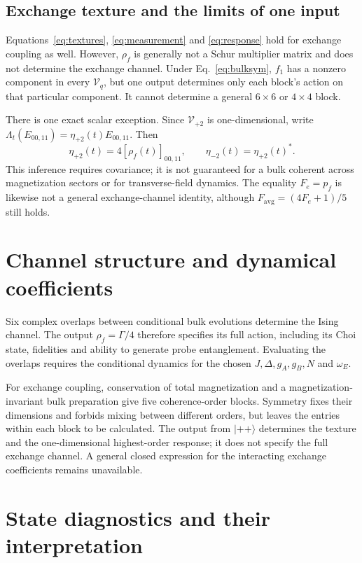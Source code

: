 \documentclass[11pt,a4paper]{article}
\newcommand{\ket}[1]{\lvert #1\rangle}
\begin{document}
\subsection{Exchange texture and the limits of one input}

Equations~\eqref{eq:textures}, \eqref{eq:measurement} and
\eqref{eq:response} hold for exchange coupling as well. However,
$\rho_f$ is generally not a Schur multiplier matrix and does not
determine the exchange channel. Under Eq.~\eqref{eq:bulksym}, $f_1$
has a nonzero component in every $\mathcal V_q$, but one output
determines only each block's action on that particular component.
It cannot determine a general $6\times6$ or $4\times4$ block.

There is one exact scalar exception. Since $\mathcal V_{+2}$ is
one-dimensional, write
$\Lambda_t(E_{00,11})=\eta_{+2}(t)E_{00,11}$. Then
\begin{equation}
 \eta_{+2}(t)=4[\rho_f(t)]_{00,11},\qquad
 \eta_{-2}(t)=\eta_{+2}(t)^*.
\end{equation}
This inference requires covariance; it is not guaranteed for a bulk
coherent across magnetization sectors or for transverse-field dynamics.
The equality $F_e=p_f$ is likewise not a general exchange-channel
identity, although $F_{\mathrm{avg}}=(4F_e+1)/5$ still holds.

\section{Channel structure and dynamical coefficients}

Six complex overlaps between conditional bulk evolutions determine the
Ising channel. The output $\rho_f=\Gamma/4$ therefore specifies its full
action, including its Choi state, fidelities and ability to generate
probe entanglement. Evaluating the overlaps requires the conditional
dynamics for the chosen $J,\Delta,g_A,g_B,N$ and $\omega_E$.

For exchange coupling, conservation of total magnetization and a
magnetization-invariant bulk preparation give five coherence-order
blocks. Symmetry fixes their dimensions and forbids mixing between
different orders, but leaves the entries within each block to be
calculated. The output from $\ket{++}$ determines the texture and the
one-dimensional highest-order response; it does not specify the full
exchange channel. A general closed expression for the interacting
exchange coefficients remains unavailable.

\appendix
\section{State diagnostics and their interpretation}\label{app:observables}
\end{document}
